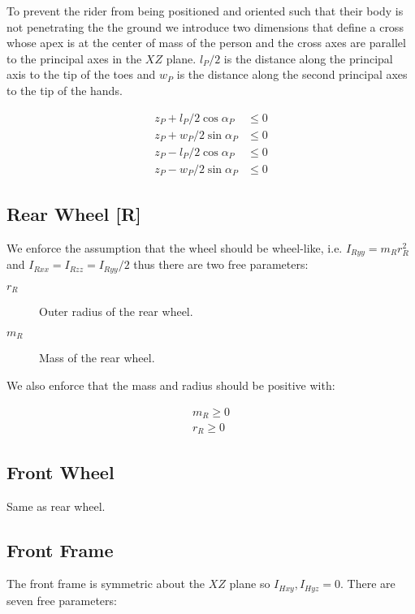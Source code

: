 \documentclass{icsc}
\begin{document}
To prevent the rider from being positioned and oriented such that their body is not penetrating the the ground we introduce two dimensions that define a cross whose apex is at the center of mass of the person and the cross axes are parallel to the principal axes in the $XZ$ plane. $l_P / 2$ is the distance along the principal axis to the tip of the toes and $w_P$ is the distance along the second principal axes to the tip of the hands.

\begin{align}
  z_P + l_P / 2 \cos{\alpha_P} & \leq 0 \\
  z_P + w_P / 2 \sin{\alpha_P} & \leq 0 \\
  z_P - l_P / 2 \cos{\alpha_P} & \leq 0 \\
  z_P - w_P / 2 \sin{\alpha_P} & \leq 0
\end{align}

\subsection{Rear Wheel [R]}

We enforce the assumption that the wheel should be wheel-like, i.e. $I_{Ryy} = m_R r_R^2$ and $I_{Rxx} = I_{Rzz} = I_{Ryy} / 2$ thus there are two free parameters:

\begin{description}
  \item[$r_R$] Outer radius of the rear wheel.
  \item[$m_R$] Mass of the rear wheel.
\end{description}

We also enforce that the mass and radius should be positive with:

\begin{align}
  m_R \geq 0 \\
  r_R \geq 0
\end{align}

\subsection{Front Wheel}

Same as rear wheel.

\subsection{Front Frame}

The front frame is symmetric about the $XZ$ plane so $I_{Hxy}, I_{Hyz} = 0$. There are seven free parameters:
\end{document}
